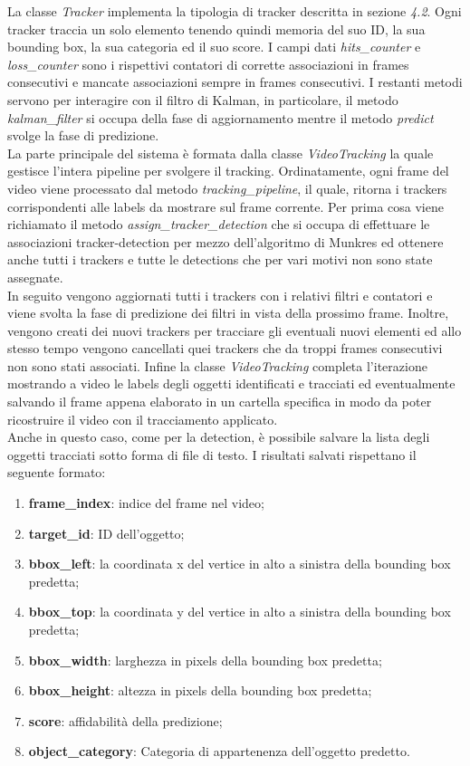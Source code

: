 La classe \textit{Tracker} implementa la tipologia di tracker descritta in sezione \textit{4.2}. Ogni tracker traccia un solo elemento tenendo quindi memoria del suo ID, la sua bounding box, la sua categoria ed il suo score. I campi dati \textit{hits\_counter} e \textit{loss\_counter} sono i rispettivi contatori di corrette associazioni in frames consecutivi e mancate associazioni sempre in frames consecutivi. I restanti metodi servono per interagire con il filtro di Kalman, in particolare, il metodo \textit{kalman\_filter} si occupa della fase di aggiornamento mentre il metodo \textit{predict} svolge la fase di predizione.\\
La parte principale del sistema è formata dalla classe \textit{VideoTracking} la quale gestisce l'intera pipeline per svolgere il tracking. Ordinatamente, ogni frame del video viene processato dal metodo \textit{tracking\_pipeline}, il quale, ritorna i trackers corrispondenti alle labels da mostrare sul frame corrente. Per prima cosa viene richiamato il metodo \textit{assign\_tracker\_detection} che si occupa di effettuare le associazioni tracker-detection per mezzo dell'algoritmo di Munkres ed ottenere anche tutti i trackers e tutte le detections che per vari motivi non sono state assegnate.\\
In seguito vengono aggiornati tutti i trackers con i relativi filtri e contatori e viene svolta la fase di predizione dei filtri in vista della prossimo frame. Inoltre, vengono creati dei nuovi trackers per tracciare gli eventuali nuovi elementi ed allo stesso tempo vengono cancellati quei trackers che da troppi frames consecutivi non sono stati associati. Infine la classe \textit{VideoTracking} completa l'iterazione mostrando a video le labels degli oggetti identificati e tracciati ed eventualmente salvando il frame appena elaborato in un cartella specifica in modo da poter ricostruire il video con il tracciamento applicato.\\
Anche in questo caso, come per la detection, è possibile salvare la lista degli oggetti tracciati sotto forma di file di testo. I risultati salvati rispettano il seguente formato:
\begin{enumerate}
\item \textbf{frame\_index}: indice del frame nel video;
\item \textbf{target\_id}: ID dell'oggetto;
\item \textbf{bbox\_left}: la coordinata x del vertice in alto a sinistra della bounding box predetta;
\item \textbf{bbox\_top}: la coordinata y del vertice in alto a sinistra della bounding box predetta;
\item \textbf{bbox\_width}: larghezza in pixels della bounding box predetta;
\item \textbf{bbox\_height}: altezza in pixels della bounding box predetta;
\item \textbf{score}: affidabilità della predizione;
\item \textbf{object\_category}: Categoria di appartenenza dell'oggetto predetto.
\end{enumerate}
